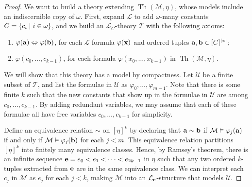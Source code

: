 \begin{proof}
	We want to build a theory extending \( \operatorname{Th}(\mathcal M, \eta) \), whose models include an indiscernible copy of \( \omega \).
	First, expand \( \mathcal L \) to add \( \omega \)-many constants \( C = \qty{c_i \mid i \in \omega} \), and we build an \( \mathcal L_C \)-theory \( \mathcal T \) with the following axioms:
	\begin{enumerate}
		\item \( \varphi(\vb a) \Leftrightarrow \varphi(\vb b) \), for each \( \mathcal L \)-formula \( \varphi(\vb x) \) and ordered tuples \( \vb a, \vb b \in [C]^{\abs{\vb x}} \);
		\item \( \varphi(c_0, \dots, c_{k-1}) \), for each formula \( \varphi(x_0, \dots, x_{k-1}) \) in \( \operatorname{Th}(\mathcal M, \eta) \).
	\end{enumerate}
	We will show that this theory has a model by compactness.
	Let \( \mathcal U \) be a finite subset of \( \mathcal T \), and list the formulae in \( \mathcal U \) as \( \varphi_0, \dots, \varphi_{m-1} \).
	Note that there is some finite \( k \) such that the new constants that show up in the formulae in \( \mathcal U \) are among \( c_0, \dots, c_{k-1} \).
	By adding redundant variables, we may assume that each of these formulae all have free variables \( c_0, \dots, c_{k-1} \) for simplicity.

	Define an equivalence relation \( \sim \) on \( [\eta]^k \) by declaring that \( \vb a \sim \vb b \) if \( \mathcal M \vDash \varphi_j(\vb a) \) if and only if \( \mathcal M \vDash \varphi_j(\vb b) \) for each \( j < m \).
	This equivalence relation partitions \( [\eta]^k \) into finitely many equivalence classes.
	Hence, by Ramsey's theorem, there is an infinite sequence \( \vb e = e_0 < e_1 < \dots < e_{2k-1} \) in \( \eta \) such that any two ordered \( k \)-tuples extracted from \( \vb e \) are in the same equivalence class.
	We can interpret each \( c_j \) in \( \mathcal M \) as \( e_j \) for each \( j < k \), making \( \mathcal M \) into an \( \mathcal L_{\vb c} \)-structure that models \( \mathcal U \).


\end{proof}
